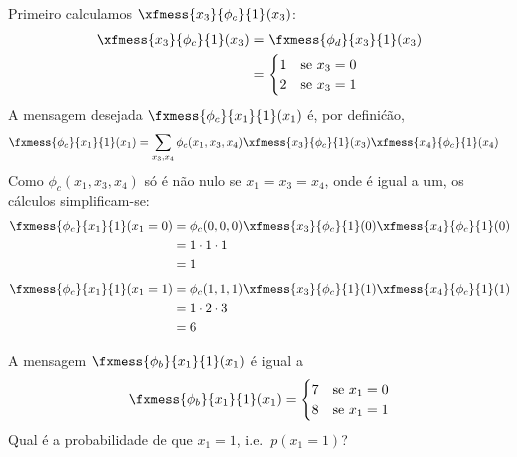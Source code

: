 \begin{exenumerate}
    \begin{solution}
        
        Primeiro calculamos $\xfmess{x_3}{\phi_c}{1}(x_3)$:
        \begin{align}
            \xfmess{x_3}{\phi_c}{1}(x_3) & = \fxmess{\phi_d}{x_3}{1}(x_3)\\
            & = \begin{cases}
                1 & \text{se } x_3=0\\
                2 & \text{se } x_3=1
            \end{cases}
        \end{align}
        A mensagem desejada $\fxmess{\phi_c}{x_1}{1}(x_1)$ \'e, por defini\'c\~ao,
        \begin{align}
            \fxmess{\phi_c}{x_1}{1}(x_1) & = \sum_{x_3,x_4} \phi_c(x_1,x_3,x_4) \xfmess{x_3}{\phi_c}{1}(x_3) \xfmess{x_4}{\phi_c}{1}(x_4)
        \end{align}
        Como $\phi_c(x_1,x_3,x_4)$ s\'o \'e n\~ao nulo se $x_1=x_3=x_4$, onde \'e igual a um, os c\'alculos simplificam-se:
        \begin{align}
            \fxmess{\phi_c}{x_1}{1}(x_1=0) & = \phi_c(0,0,0) \xfmess{x_3}{\phi_c}{1}(0) \xfmess{x_4}{\phi_c}{1}(0)\\
            & = 1 \cdot 1 \cdot 1\\
            & = 1
        \end{align}
        \begin{align}
            \fxmess{\phi_c}{x_1}{1}(x_1=1) & = \phi_c(1,1,1) \xfmess{x_3}{\phi_c}{1}(1) \xfmess{x_4}{\phi_c}{1}(1)\\
            & = 1 \cdot 2 \cdot 3\\
            & = 6
        \end{align}
    \end{solution}
    
    
    \item A mensagem $\fxmess{\phi_b}{x_1}{1}(x_1)$ \'e igual a
    $$ \fxmess{\phi_b}{x_1}{1}(x_1) = \begin{cases}
        7 & \text{se } x_1=0\\
        8 & \text{se } x_1=1\\
    \end{cases} $$
    Qual \'e a probabilidade de que $x_1=1$, i.e.\ $p(x_1=1)$?
    

\end{exenumerate}
